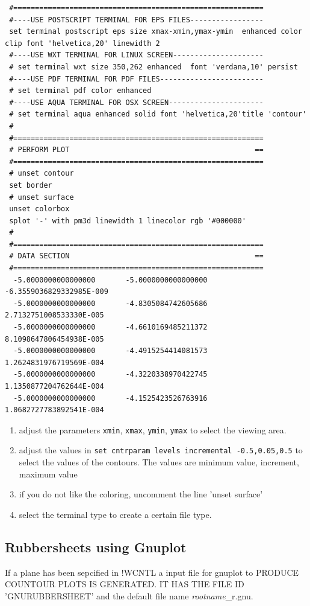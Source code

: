 \documentclass[final,12pt]{article}
\begin{document}
{{{{{{{\begin{verbatim}
 #==========================================================
 #----USE POSTSCRIPT TERMINAL FOR EPS FILES-----------------
 set terminal postscript eps size xmax-xmin,ymax-ymin  enhanced color clip font 'helvetica,20' linewidth 2 
 #----USE WXT TERMINAL FOR LINUX SCREEN---------------------
 # set terminal wxt size 350,262 enhanced  font 'verdana,10' persist 
 #----USE PDF TERMINAL FOR PDF FILES------------------------
 # set terminal pdf color enhanced 
 #----USE AQUA TERMINAL FOR OSX SCREEN----------------------
 # set terminal aqua enhanced solid font 'helvetica,20'title 'contour'
 #
 #==========================================================
 # PERFORM PLOT                                           ==
 #==========================================================
 # unset contour
 set border
 # unset surface
 unset colorbox
 splot '-' with pm3d linewidth 1 linecolor rgb '#000000'
 #
 #==========================================================
 # DATA SECTION                                           ==
 #==========================================================
  -5.0000000000000000       -5.0000000000000000       -6.3559036829332985E-009
  -5.0000000000000000       -4.8305084742605686        2.7132751008533330E-005
  -5.0000000000000000       -4.6610169485211372        8.1098647806454938E-005
  -5.0000000000000000       -4.4915254414081573        1.2624831976719569E-004
  -5.0000000000000000       -4.3220338970422745        1.1350877204762644E-004
  -5.0000000000000000       -4.1525423526763916        1.0682727783892541E-004
 \end{verbatim}}

\begin{enumerate}
\item adjust the parameters \verb|xmin|, \verb|xmax|, \verb|ymin|,
 \verb|ymax| to select the viewing area.
\item adjust the values in
 \verb|set cntrparam levels incremental -0.5,0.05,0.5| to select the
 values of the contours. The values are minimum value, increment,
 maximum value
\item if you do not like the coloring, uncomment the line 'unset surface'
\item select the terminal type to create a certain file type.
\end{enumerate}
\newpage
\subsection{Rubbersheets  using Gnuplot}
If a plane has been sepcified in !WCNTL a input file for gnuplot to
PRODUCE COUNTOUR PLOTS IS GENERATED. IT HAS THE FILE ID 'GNURUBBERSHEET'
and the default file name \textit{rootname}\_r.gnu.

}}}}}}
\end{document}
